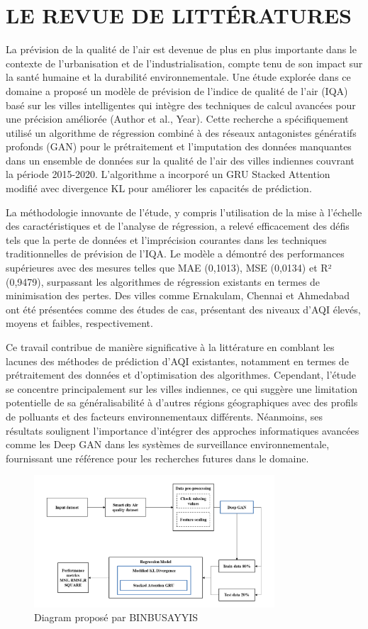 \documentclass[12pt,a4paper]{report}
\begin{document}
\chapter{LE REVUE DE LITTÉRATURES}
La prévision de la qualité de l'air est devenue de plus en plus importante dans le contexte de l'urbanisation et de l'industrialisation, compte tenu de son impact sur la santé humaine et la durabilité environnementale. Une étude explorée dans ce domaine a proposé un modèle de prévision de l'indice de qualité de l'air (IQA) basé sur les villes intelligentes qui intègre des techniques de calcul avancées pour une précision améliorée (Author et al., Year). Cette recherche a spécifiquement utilisé un algorithme de régression combiné à des réseaux antagonistes génératifs profonds (GAN) pour le prétraitement et l'imputation des données manquantes dans un ensemble de données sur la qualité de l'air des villes indiennes couvrant la période 2015-2020. L'algorithme a incorporé un GRU Stacked Attention modifié avec divergence KL pour améliorer les capacités de prédiction.

La méthodologie innovante de l'étude, y compris l'utilisation de la mise à l'échelle des caractéristiques et de l'analyse de régression, a relevé efficacement des défis tels que la perte de données et l'imprécision courantes dans les techniques traditionnelles de prévision de l'IQA. Le modèle a démontré des performances supérieures avec des mesures telles que MAE (0,1013), MSE (0,0134) et R² (0,9479), surpassant les algorithmes de régression existants en termes de minimisation des pertes. Des villes comme Ernakulam, Chennai et Ahmedabad ont été présentées comme des études de cas, présentant des niveaux d'AQI élevés, moyens et faibles, respectivement.

Ce travail contribue de manière significative à la littérature en comblant les lacunes des méthodes de prédiction d'AQI existantes, notamment en termes de prétraitement des données et d'optimisation des algorithmes. Cependant, l'étude se concentre principalement sur les villes indiennes, ce qui suggère une limitation potentielle de sa généralisabilité à d'autres régions géographiques avec des profils de polluants et des facteurs environnementaux différents. Néanmoins, ses résultats soulignent l'importance d'intégrer des approches informatiques avancées comme les Deep GAN dans les systèmes de surveillance environnementale, fournissant une référence pour les recherches futures dans le domaine.

\begin{figure}[h]
    \centering
    \includegraphics[width=0.8\textwidth]{diagram1.png}
    \caption{Diagram proposé par BINBUSAYYIS}
    \label{fig:Diagram}
\end{figure}
\end{document}
